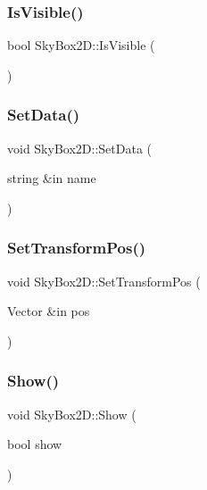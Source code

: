 \hypertarget{class_sky_box2_d_a7254a706c29b3108876ac07a0ea17779}{}\label{class_sky_box2_d_a7254a706c29b3108876ac07a0ea17779} 
\subsubsection{\texorpdfstring{Is\+Visible()}{IsVisible()}}
{\footnotesize\ttfamily bool Sky\+Box2\+D\+::\+Is\+Visible (\begin{DoxyParamCaption}{ }\end{DoxyParamCaption})}

\hypertarget{class_sky_box2_d_a3eef8acd8c8022bbad07521ad710fe71}{}\label{class_sky_box2_d_a3eef8acd8c8022bbad07521ad710fe71} 
\subsubsection{\texorpdfstring{Set\+Data()}{SetData()}}
{\footnotesize\ttfamily void Sky\+Box2\+D\+::\+Set\+Data (\begin{DoxyParamCaption}\item[{string \&in}]{name }\end{DoxyParamCaption})}

\hypertarget{class_sky_box2_d_ae8ea2553fe9f28919de8c80305264750}{}\label{class_sky_box2_d_ae8ea2553fe9f28919de8c80305264750} 
\subsubsection{\texorpdfstring{Set\+Transform\+Pos()}{SetTransformPos()}}
{\footnotesize\ttfamily void Sky\+Box2\+D\+::\+Set\+Transform\+Pos (\begin{DoxyParamCaption}\item[{Vector \&in}]{pos }\end{DoxyParamCaption})}

\hypertarget{class_sky_box2_d_ac0263a32805d4181dde4bd23178554b5}{}\label{class_sky_box2_d_ac0263a32805d4181dde4bd23178554b5} 
\subsubsection{\texorpdfstring{Show()}{Show()}}
{\footnotesize\ttfamily void Sky\+Box2\+D\+::\+Show (\begin{DoxyParamCaption}\item[{bool}]{show }\end{DoxyParamCaption})}

